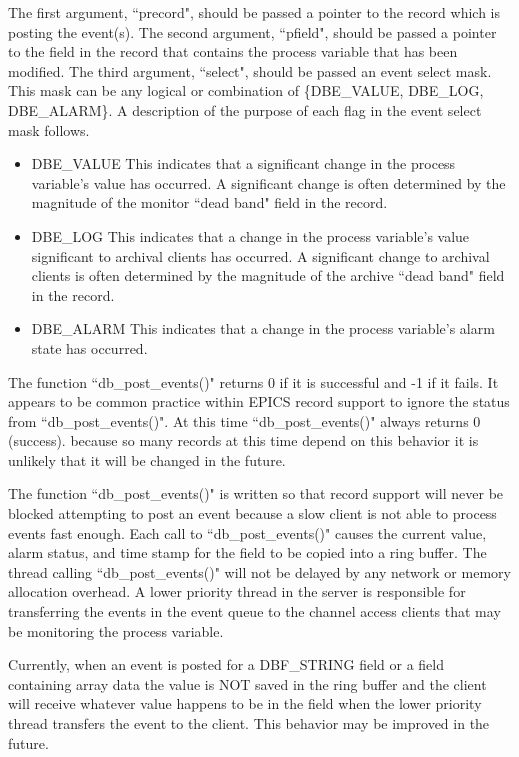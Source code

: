 The first argument, ``precord", should be passed a pointer to the record which is posting the event(s). The second 
argument, ``pfield", should be passed a pointer to the field in the record that contains the process variable that has been 
modified. The third argument, ``select", should be passed an event select mask. This mask can be any logical or 
combination of \{DBE\_VALUE, DBE\_LOG, DBE\_ALARM\}. A description of the purpose of each flag in the event select 
mask follows.

\begin{itemize}
\item DBE\_VALUE This indicates that a significant change in the process variable's value has occurred. A significant 
change is often determined by the magnitude of the monitor ``dead band" field in the record.

\item DBE\_LOG This indicates that a change in the process variable's value significant to archival clients has occurred. 
A significant change to archival clients is often determined by the magnitude of the archive ``dead band" field in 
the record.

\item DBE\_ALARM This indicates that a change in the process variable's alarm state has occurred.

\end{itemize}

The function ``db\_post\_events()" returns 0 if it is successful and -1 if it fails. It appears to be common practice within 
EPICS record support to ignore the status from ``db\_post\_events()". At this time ``db\_post\_events()" always returns 0 
(success). because so many records at this time depend on this behavior it is unlikely that it will be changed in the future.

The function ``db\_post\_events()" is written so that record support will never be blocked attempting to post an event 
because a slow client is not able to process events fast enough. Each call to ``db\_post\_events()" causes the current value, 
alarm status, and time stamp for the field to be copied into a ring buffer. The thread calling ``db\_post\_events()" will not be 
delayed by any network or memory allocation overhead. A lower priority thread in the server is responsible for 
transferring the events in the event queue to the channel access clients that may be monitoring the process variable.

Currently, when an event is posted for a DBF\_STRING field or a field containing array data the value is NOT saved in the 
ring buffer and the client will receive whatever value happens to be in the field when the lower priority thread transfers 
the event to the client. This behavior may be improved in the future.

